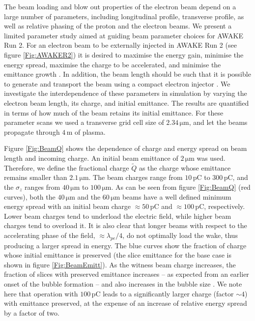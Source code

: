 \documentclass[aps,prstab,reprint,amsmath,amssymb,groupedaddress]{revtex4-1}
\newcommand{\unit}[1]{\,\mathrm{#1}}
\begin{document}
The beam loading and blow out properties of the electron beam depend on a large number of parameters, including
longitudinal profile, transverse profile, as well as relative phasing of the proton and the electron beams. We present a
limited parameter study aimed at guiding beam parameter choices for AWAKE Run 2. For an electron beam to be externally
injected in AWAKE Run 2 (see figure \ref{Fig:AWAKER2}) it is desired to maximise the energy gain, minimise the energy
spread, maximise the charge to be accelerated, and minimise the emittance growth \cite{adli:2016}. In addition, the
beam length should be such that it is possible to generate and transport the beam using a compact electron injector
\cite{adli:2016}. We investigate the interdependence of these parameters in simulation by varying the electron beam
length, its charge, and initial emittance. The results are quantified in terms of how much of the beam retains its
initial emittance. For these parameter scans we used a transverse grid cell size of $2.34\unit{\mu m}$, and let the
beams propagate through $4\unit{m}$ of plasma.

Figure \ref{Fig:BeamQ} shows the dependence of charge and energy spread on beam length and incoming charge. An initial
beam emittance of $2\unit{\mu m}$ was used. Therefore, we define the fractional charge $\widetilde{Q}$ as the charge
whose emittance remains smaller than $2.1\unit{\mu m}$. The beam charges range from $10\unit{pC}$ to $300\unit{pC}$, and
the $\sigma_{z}$ ranges from $40\unit{\mu m}$ to $100\unit{\mu m}$. As can be seen from figure \ref{Fig:BeamQ} (red
curves), both the $40\unit{\mu m}$ and the $60\unit{\mu m}$ beams have a well defined minimum energy spread with an
initial beam charge $\approx 50\unit{pC}$ and $\approx 100\unit{pC}$, respectively. Lower beam charges tend to
underload the electric field, while higher beam charges tend to overload it. It is also clear that longer beams with
respect to the accelerating phase of the field, $\approx\lambda_{pe}/4$, do not optimally load the wake, thus producing
a larger spread in energy. The blue curves show the fraction of charge whose initial emittance is preserved (the slice
emittance for the base case is shown in figure \ref{Fig:BeamEmitt}). As the witness beam charge increases, the fraction
of slices with preserved emittance increases -- as expected from an earlier onset of the bubble formation -- and also
increases in the bubble size \cite{lu:2006-1, lu:2006}. We note here that operation with $100\unit{pC}$ leads to a
significantly larger charge (factor $\sim 4$) with emittance preserved, at the expense of an increase of relative energy
spread by a factor of two.
\end{document}
